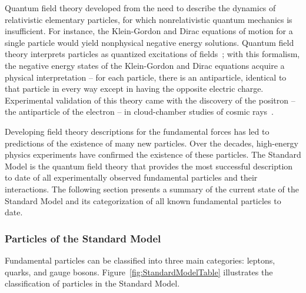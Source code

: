 
Quantum field theory developed from the need to describe the dynamics of relativistic elementary particles, for which nonrelativistic quantum mechanics is insufficient. For instance, the Klein-Gordon and Dirac equations of motion for a single particle would yield nonphysical negative energy solutions. Quantum field theory interprets particles as quantized excitations of fields~\cite{PeskinSchroederPhysics}; with this formalism, the negative energy states of the Klein-Gordon and Dirac equations acquire a physical interpretation -- for each particle, there is an antiparticle, identical to that particle in every way except in having the opposite electric charge. Experimental validation of this theory came with the discovery of the positron -- the antiparticle of the electron -- in cloud-chamber studies of cosmic rays~\cite{BettiniPhysics}.

Developing field theory descriptions for the fundamental forces has led to predictions of the existence of many new particles. Over the decades, high-energy physics experiments have confirmed the existence of these particles. The Standard Model is the quantum field theory that provides the most successful description to date of all experimentally observed fundamental particles and their interactions. The following section presents a summary of the current state of the Standard Model and its categorization of all known fundamental particles to date.

\subsubsection{Particles of the Standard Model\label{sec:SM-particles}}

Fundamental particles can be classified into three main categories: leptons, quarks, and gauge bosons. Figure~\ref{fig:StandardModelTable} illustrates the classification of particles in the Standard Model.

